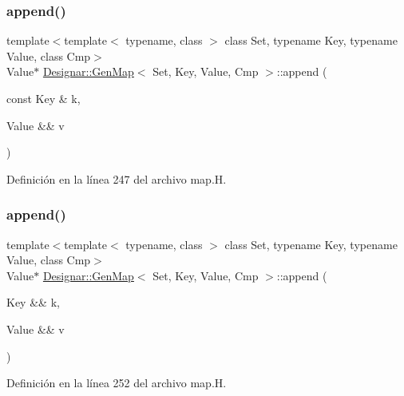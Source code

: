 \subsubsection{\texorpdfstring{append()}{append()}\hspace{0.1cm}{\footnotesize\ttfamily [3/4]}}
{\footnotesize\ttfamily template$<$template$<$ typename, class $>$ class Set, typename Key, typename Value, class Cmp$>$ \\
Value$\ast$ \hyperlink{class_designar_1_1_gen_map}{Designar\+::\+Gen\+Map}$<$ Set, Key, Value, Cmp $>$\+::append (\begin{DoxyParamCaption}\item[{const Key \&}]{k,  }\item[{Value \&\&}]{v }\end{DoxyParamCaption})\hspace{0.3cm}{\ttfamily [inline]}}



Definición en la línea 247 del archivo map.\+H.

\mbox{\label{class_designar_1_1_gen_map_a3bb1fd57e4ff94c0e585b41a359d0c52}} 
\subsubsection{\texorpdfstring{append()}{append()}\hspace{0.1cm}{\footnotesize\ttfamily [4/4]}}
{\footnotesize\ttfamily template$<$template$<$ typename, class $>$ class Set, typename Key, typename Value, class Cmp$>$ \\
Value$\ast$ \hyperlink{class_designar_1_1_gen_map}{Designar\+::\+Gen\+Map}$<$ Set, Key, Value, Cmp $>$\+::append (\begin{DoxyParamCaption}\item[{Key \&\&}]{k,  }\item[{Value \&\&}]{v }\end{DoxyParamCaption})\hspace{0.3cm}{\ttfamily [inline]}}



Definición en la línea 252 del archivo map.\+H.

\mbox{\label{class_designar_1_1_gen_map_ad768d9e00839f4d328a1394ffc806d83}} 
